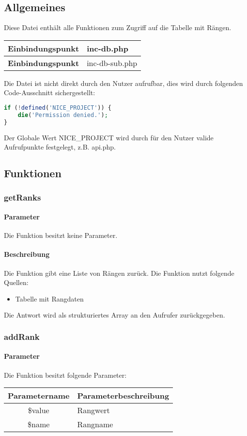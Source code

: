 \subsection{Allgemeines} Diese Datei enthält alle Funktionen zum Zugriff auf die Tabelle mit Rängen.
\begin{table}[H]
	\begin{tabular}{|c|p{11cm}|}
		\hline
		\textbf{Einbindungspunkt} & inc-db.php \\ \hline
		\textbf{Einbindungspunkt} & inc-db-sub.php \\ \hline
	\end{tabular}
\end{table}
Die Datei ist nicht direkt durch den Nutzer aufrufbar, dies wird durch folgenden Code-Ausschnitt sichergestellt:
\begin{lstlisting}[language=php]
if (!defined('NICE_PROJECT')) {
	die('Permission denied.');
}
\end{lstlisting}
Der Globale Wert {\glqq NICE\_PROJECT\grqq} wird durch für den Nutzer valide Aufrufpunkte festgelegt, z.B. {\glqq api.php\grqq}.
\newpage
\subsection{Funktionen}
\subsubsection{getRanks}
\paragraph{Parameter} Die Funktion besitzt keine Parameter.
\paragraph{Beschreibung} Die Funktion gibt eine Liste von Rängen zurück. Die Funktion nutzt folgende Quellen:
\begin{itemize}
	\item Tabelle mit Rangdaten
\end{itemize}
Die Antwort wird als strukturiertes Array an den Aufrufer zurückgegeben.
\subsubsection{addRank}
\paragraph{Parameter} Die Funktion besitzt folgende Parameter:
\begin{table}[H]
	\begin{tabular}{|c|p{11cm}|}
		\hline
		\textbf{Parametername} & \textbf{Parameterbeschreibung} \\ \hline
		\$value & Rangwert \\ \hline
		\$name  & Rangname \\ \hline
	\end{tabular}
\end{table}
